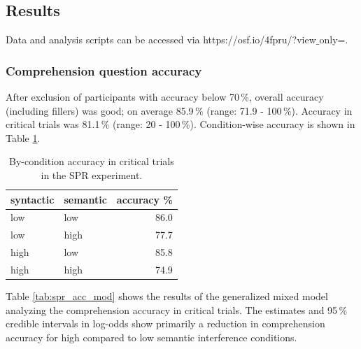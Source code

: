 \documentclass[a4paper, man, floatsintext]{apa7}
\begin{document}


\subsection{Results}
Data and analysis scripts can be accessed via https://osf.io/4fpru/?view$\_$only=.

\subsubsection{Comprehension question accuracy}
After exclusion of participants with accuracy below 70\,\%, overall accuracy (including fillers) was good; on average 85.9\,\% (range: 71.9 - 100\,\%). Accuracy in critical trials was 81.1\,\% (range: 20 - 100\,\%). Condition-wise accuracy is shown in Table \ref{tab:spr_acc}.

\begin{table}[]
    \caption{By-condition accuracy in critical trials in the SPR experiment.}
    \label{tab:spr_acc}
    \centering
    \begin{tabular}{llr}
    \toprule
    syntactic & semantic & accuracy \%\\
    \midrule
        low &  low & 86.0\\
        low &  high & 77.7\\
        high &  low & 85.8\\
        high &  high & 74.9\\
    \bottomrule
    \end{tabular}
\end{table}

Table \ref{tab:spr_acc_mod} shows the results of the generalized mixed model analyzing the comprehension accuracy in critical trials. The estimates and 95\,\% credible intervals in log-odds show primarily a reduction in comprehension accuracy for high compared to low semantic interference conditions.
\end{document}
